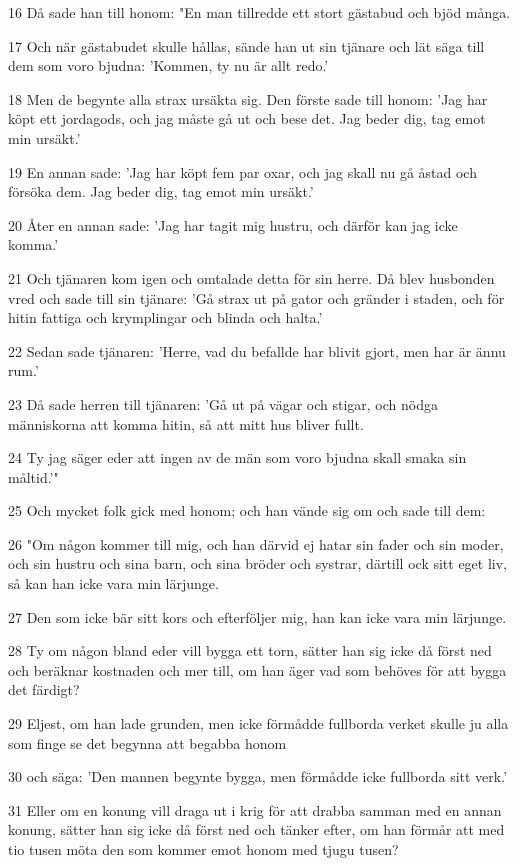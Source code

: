\par 16 Då sade han till honom: "En man tillredde ett stort gästabud och bjöd många.
\par 17 Och när gästabudet skulle hållas, sände han ut sin tjänare och lät säga till dem som voro bjudna: 'Kommen, ty nu är allt redo.'
\par 18 Men de begynte alla strax ursäkta sig. Den förste sade till honom: 'Jag har köpt ett jordagods, och jag måste gå ut och bese det. Jag beder dig, tag emot min ursäkt.'
\par 19 En annan sade: 'Jag har köpt fem par oxar, och jag skall nu gå åstad och försöka dem. Jag beder dig, tag emot min ursäkt.'
\par 20 Åter en annan sade: 'Jag har tagit mig hustru, och därför kan jag icke komma.'
\par 21 Och tjänaren kom igen och omtalade detta för sin herre. Då blev husbonden vred och sade till sin tjänare: 'Gå strax ut på gator och gränder i staden, och för hitin fattiga och krymplingar och blinda och halta.'
\par 22 Sedan sade tjänaren: 'Herre, vad du befallde har blivit gjort, men har är ännu rum.'
\par 23 Då sade herren till tjänaren: 'Gå ut på vägar och stigar, och nödga människorna att komma hitin, så att mitt hus bliver fullt.
\par 24 Ty jag säger eder att ingen av de män som voro bjudna skall smaka sin måltid.'"
\par 25 Och mycket folk gick med honom; och han vände sig om och sade till dem:
\par 26 "Om någon kommer till mig, och han därvid ej hatar sin fader och sin moder, och sin hustru och sina barn, och sina bröder och systrar, därtill ock sitt eget liv, så kan han icke vara min lärjunge.
\par 27 Den som icke bär sitt kors och efterföljer mig, han kan icke vara min lärjunge.
\par 28 Ty om någon bland eder vill bygga ett torn, sätter han sig icke då först ned och beräknar kostnaden och mer till, om han äger vad som behöves för att bygga det färdigt?
\par 29 Eljest, om han lade grunden, men icke förmådde fullborda verket skulle ju alla som finge se det begynna att begabba honom
\par 30 och säga: 'Den mannen begynte bygga, men förmådde icke fullborda sitt verk.'
\par 31 Eller om en konung vill draga ut i krig för att drabba samman med en annan konung, sätter han sig icke då först ned och tänker efter, om han förmår att med tio tusen möta den som kommer emot honom med tjugu tusen?
